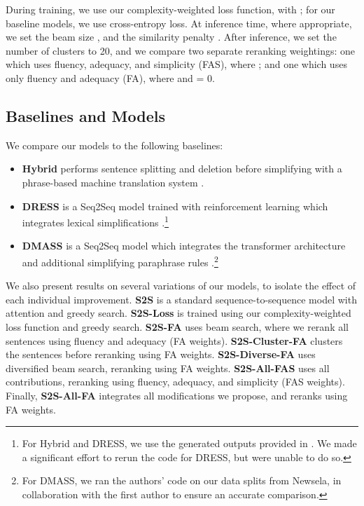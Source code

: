 \documentclass[11pt,a4paper]{article}
\begin{document}
During training, we use our complexity-weighted loss function, with ; for our baseline models, we use cross-entropy loss. At inference time, where appropriate, we set the beam size , and the similarity penalty . After inference, we set the number of clusters to 20, and we compare two separate reranking weightings: one which uses fluency, adequacy, and simplicity (FAS), where ; and one which uses only fluency and adequacy (FA), where  and  = 0.

\subsection{Baselines and Models}

We compare our models to the following baselines:

\begin{itemize}
    \item \textbf{Hybrid} performs sentence splitting and deletion before simplifying with a phrase-based machine translation system \cite{narayan2014hybrid}.
    \item \textbf{DRESS} is a Seq2Seq model trained with reinforcement learning which integrates lexical simplifications \cite{zhang2017sentence}.\footnote{For Hybrid and DRESS, we use the generated outputs provided in . We made a significant effort to rerun the code for DRESS, but were unable to do so.}
    \item \textbf{DMASS} is a Seq2Seq model which integrates the transformer architecture and additional simplifying paraphrase rules \cite{zhao2018integrating}.\footnote{For DMASS, we ran the authors' code on our data splits from Newsela, in collaboration with the first author to ensure an accurate comparison.}
\end{itemize}

We also present results on several variations of our models, to isolate the effect of each individual improvement.
\textbf{S2S} is a standard sequence-to-sequence model with attention and greedy search. \textbf{S2S-Loss} is trained using our complexity-weighted loss function and greedy search. \textbf{S2S-FA} uses beam search, where we rerank all sentences using fluency and adequacy (FA weights). \textbf{S2S-Cluster-FA}  clusters the sentences before reranking using FA weights. \textbf{S2S-Diverse-FA} uses diversified beam search, reranking using FA weights. \textbf{S2S-All-FAS} uses all contributions, reranking using fluency, adequacy, and simplicity (FAS weights). 
Finally, \textbf{S2S-All-FA} integrates all modifications we propose, and reranks using FA weights.
\end{document}
